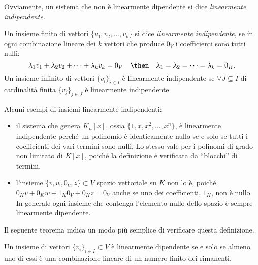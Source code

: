 Ovviamente, un sistema che non è linearmente dipendente si dice \emph{linearmente indipendente}.

\begin{definizione} \label{d:indipendenza-lineare}
	Un insieme finito di vettori $\{v_1, v_2,\dots, v_k\}$ si dice \emph{linearmente indipendente}, se in ogni combinazione lineare dei $k$ vettori che produce $0_V$ i coefficienti sono tutti nulli:
	\begin{equation*}
		\lambda_1 v_1+\lambda_2 v_2+\dots+\lambda_k v_k=0_V\quad\then\quad\lambda_1=\lambda_2=\dots=\lambda_k=0_K.
	\end{equation*}
	Un insieme infinito di vettori $\{v_i\}_{i\in I}$ è linearmente indipendente se $\forall J\subseteq I$ di cardinalità finita $\{v_j\}_{j\in J}$ è linearmente indipendente.
\end{definizione}
Alcuni esempi di insiemi linearmente indipendenti:
\begin{itemize}
	\item il sistema che genera $K_n[x]$, ossia $\{1,x,x^2,\dots,x^n\}$, è linearmente indipendente perché un polinomio è identicamente nullo se e solo se tutti i coefficienti dei vari termini sono nulli.
		Lo stesso vale per i polinomi di grado non limitato di $K[x]$, poiché la definizione è verificata da ``blocchi'' di termini.
	\item l'insieme $\{v,w,0_V,z\}\subset V$ spazio vettoriale su $K$ non lo è, poiché $0_Kv+0_Kw+1_K0_V+0_Kz=0_V$ anche se uno dei coefficienti, $1_K$, non è nullo.
		In generale ogni insieme che contenga l'elemento nullo dello spazio è sempre linearmente dipendente.
\end{itemize}
Il seguente teorema indica un modo più semplice di verificare questa definizione.
\begin{teorema}
	Un insieme di vettori $\{v_i\}_{i\in I}\subset V$ è linearmente dipendente se e solo se almeno uno di essi è una combinazione lineare di un numero finito dei rimanenti.
\end{teorema}
